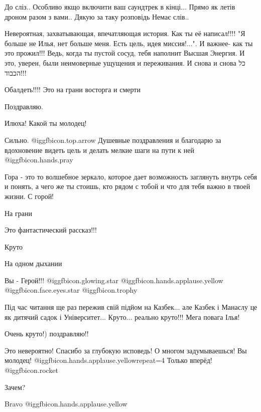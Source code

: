 \begin{itemize}
До сліз..
Особливо якщо включити ваш саундтрек в кінці...
Прямо як летів дроном разом з вами..
Дякую за таку розповідь
Немає слів..


Невероятная, захватывающая, впечатляющая история. Как ты её написал!!!! "Я
больше не Илья, нет больше меня. Есть цель, идея миссия!...". И важнее- как ты
это прожил!!! Ведь, когда ты пустой сосуд, тебя наполнит Высшая Энергия. И это,
уверен, были неимоверные ущущения и переживания. И снова и снова כל הכבוד!!!

Обалдеть!!!! Это на грани восторга и смерти

Поздравляю.

Илюха! Какой ты молодец!

Сильно.  @igg{fbicon.top.arrow} 
Душевные поздравления и благодарю за вдохновение видеть цель и делать мелкие шаги на пути к ней  @igg{fbicon.hands.pray} 


Гора - это то волшебное зеркало, которое дает возможность заглянуть внутрь себя
и понять, а чего же ты стоишь, кто рядом с тобой и что для тебя важно в твоей
жизни. С горой!


На грани

Это фантастический рассказ!!!

Круто

На одном дыхании

Вы - Герой!!! @igg{fbicon.glowing.star}  @igg{fbicon.hands.applause.yellow}  @igg{fbicon.face.eyes.star}  @igg{fbicon.trophy} 


Під час читання ще раз пережив свій підйом на Казбек... але Казбек і Манаслу це
як дитячий садок і Університет... Круто... реально круто!!! Мега повага Ілья!


Очень круто!) поздравляю!!

Это невероятно! Спасибо за глубокую исповедь! О многом задумываешься! Вы молодец!  @igg{fbicon.hands.applause.yellow}{repeat=4}  Только вперёд! @igg{fbicon.rocket} 

Зачем?

Bravo  @igg{fbicon.hands.applause.yellow} 


\end{itemize}
